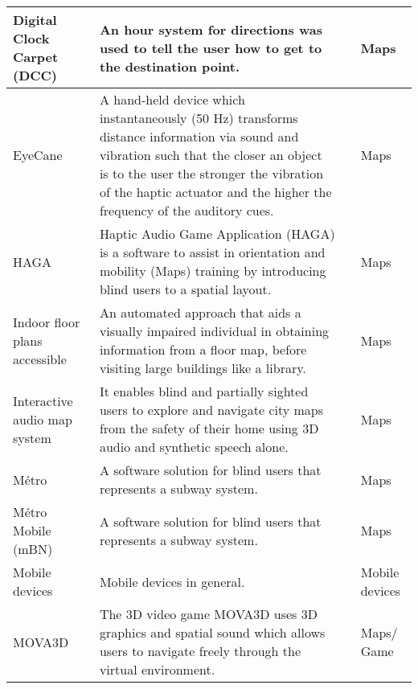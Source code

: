 \begin{small}
\begin{longtable}[h]{m{2.5cm}m{5cm}m{3cm}m{2cm}}
            Digital Clock Carpet (DCC) & An hour system for directions was used to tell the user how to get to the destination point. & {\tiny \cite{Sanchez2010b}} & Maps \\ \hline
            
            EyeCane & A hand-held device which instantaneously (50 Hz) transforms distance information via sound and vibration such that the closer an object is to the user the stronger the vibration of the haptic actuator and the higher the frequency of the auditory cues. & {\tiny \cite{Buchs2017}} & Maps \\ \hline
            
            HAGA & Haptic Audio Game Application (HAGA) is a software to assist in orientation and mobility (Maps) training by introducing blind users to a spatial layout. & {\tiny \cite{Merabet2016}} & Maps \\ \hline
            
            Indoor floor plans accessible & An automated approach that aids a visually impaired individual in obtaining information from a floor map, before visiting large buildings like a library. & {\tiny \cite{Paladugu2015}} & Maps \\ \hline
            
            Interactive audio map system & It enables blind and partially sighted users to explore and navigate city maps from the safety of their home using 3D audio and synthetic speech alone. & {\tiny \cite{Stojmenovic2014}} & Maps \\ \hline
            
            Métro & A software solution for blind users that represents a subway system. & {\tiny \cite{Sanchezb}} & Maps \\ \hline
            
            Métro Mobile (mBN) & A software solution for blind users that represents a subway system. & {\tiny \cite{Sanchezb}} & Maps \\ \hline
            
            Mobile devices & Mobile devices in general. & {\tiny \cite{Guerreiro2011}} & Mobile devices \\ \hline
            
            MOVA3D & The 3D video game MOVA3D uses 3D graphics and spatial sound which allows users to navigate freely through the virtual environment. & {\tiny \cite{Sanchez2010b}} & Maps$/$Game \\ \hline
            

\end{longtable}
\end{small}
